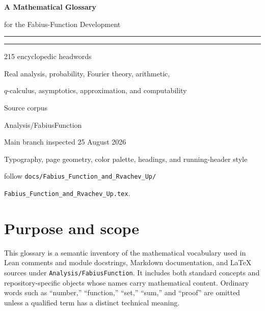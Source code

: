\documentclass[11pt,oneside]{article}
\theoremstyle{definition}
\theoremstyle{remark}
\newcommand{\repo}{\nolinkurl{Analysis/FabiusFunction}}
\begin{document}
\hypersetup{pageanchor=false}

\begin{titlepage}
\centering
\vspace*{1.55cm}
{\Huge\bfseries A Mathematical Glossary\par}
\vspace{0.3cm}
{\LARGE\color{linkblue} for the Fabius-Function Development\par}
\vspace{0.9cm}
\textcolor{linkblue}{\rule{0.82\textwidth}{1.3pt}}\par
\vspace{0.4cm}
\textcolor{rulegray}{\rule{0.62\textwidth}{0.7pt}}\par
\vspace{1.15cm}
{\Large 215 encyclopedic headwords\par}
\vspace{0.35cm}
{\large Real analysis, probability, Fourier theory, arithmetic,\par
$q$-calculus, asymptotics, approximation, and computability\par}
\vfill
{\large Source corpus\par}
\vspace{0.15cm}
{\ttfamily\large Analysis/FabiusFunction\par}
\vspace{0.7cm}
{\large Main branch inspected 25 August 2026\par}
\vfill
{\small Typography, page geometry, color palette, headings, and running-header style\par
follow \texttt{docs/Fabius\_Function\_and\_Rvachev\_Up/}\par
\texttt{Fabius\_Function\_and\_Rvachev\_Up.tex}.\par}
\end{titlepage}
\clearpage
\hypersetup{pageanchor=true}
\section*{Purpose and scope}
This glossary is a semantic inventory of the mathematical vocabulary used in
Lean comments and module docstrings, Markdown documentation, and LaTeX sources
under \repo.  It includes both standard concepts and repository-specific
objects whose names carry mathematical content.  Ordinary words such as
``number,'' ``function,'' ``set,'' ``sum,'' and ``proof'' are omitted unless a
qualified term has a distinct technical meaning.
\end{document}
